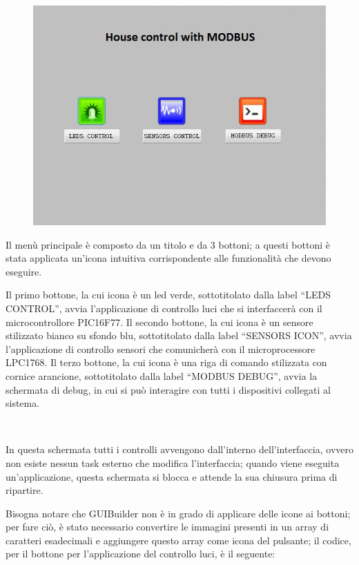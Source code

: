 \documentclass[a4paper,titlepage]{book}
\begin{document}
\begin{figure}[!ht]
\centering
\includegraphics[scale=0.6]{menu.jpg}
\end{figure}

Il menù principale è composto da un titolo e da 3 bottoni; a questi bottoni è stata applicata un'icona intuitiva corrispondente alle funzionalità che devono eseguire.

Il primo bottone, la cui icona è un led verde, sottotitolato dalla label ``LEDS CONTROL'', avvia l'applicazione di controllo luci che si interfaccerà con il microcontrollore PIC16F77. Il secondo bottone, la cui icona è un sensore stilizzato bianco su sfondo blu, sottotitolato dalla label ``SENSORS ICON'', avvia l'applicazione di controllo sensori che comunicherà con il microprocessore LPC1768. Il terzo bottone, la cui icona è una riga di comando stilizzata con cornice arancione, sottotitolato dalla label ``MODBUS DEBUG'', avvia la schermata di debug, in cui si può interagire con tutti i dispositivi collegati al sistema.

~

In questa schermata tutti i controlli avvengono dall'interno dell'interfaccia, ovvero non esiste nessun task esterno che modifica l'interfaccia; quando viene eseguita un'applicazione, questa schermata si blocca e attende la sua chiusura prima di ripartire.

Bisogna notare che GUIBuilder non è in grado di applicare delle icone ai bottoni; per fare ciò, è stato necessario convertire le immagini presenti in un array di caratteri esadecimali e aggiungere questo array come icona del pulsante; il codice, per il bottone per l'applicazione del controllo luci, è il seguente:
\end{document}
